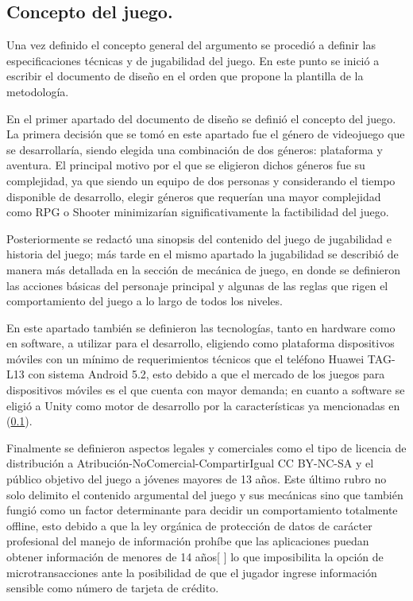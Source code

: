 \subsection{Concepto del juego.}
Una vez definido el concepto general del argumento se procedió a definir las especificaciones técnicas y de jugabilidad del juego. En este punto se inició a escribir el documento de diseño en el orden que propone la plantilla de la metodología. 
\\
\par
En el primer apartado del documento de diseño se definió el concepto del juego. La primera decisión que se tomó en este apartado fue el género de videojuego que se desarrollaría, siendo elegida una combinación de dos géneros: plataforma y aventura. El principal motivo por el que se eligieron dichos géneros fue su complejidad, ya que siendo un equipo de dos personas y considerando el tiempo disponible de desarrollo, elegir géneros que requerían una mayor complejidad como RPG o Shooter minimizarían significativamente la factibilidad del juego.  
\\
\par
Posteriormente se redactó una sinopsis del contenido del juego de jugabilidad e historia del juego; más tarde en el mismo apartado la jugabilidad se describió de manera más detallada en la sección de mecánica de juego, en donde se definieron las acciones básicas del personaje principal y algunas de las reglas que rigen el comportamiento del juego a lo largo de todos los niveles. 
\\
\par
En este apartado también se definieron las tecnologías, tanto en hardware como en software, a utilizar para el desarrollo, eligiendo como plataforma dispositivos móviles con un mínimo de requerimientos técnicos que el teléfono Huawei TAG-L13 con sistema Android 5.2, esto debido a que el mercado de los juegos para dispositivos móviles es el que cuenta con mayor demanda\cite{Ref:EGS}; en cuanto a software se eligió a Unity como motor de desarrollo por la características ya mencionadas en (\ref{}). 
\\
\par
Finalmente se definieron aspectos legales y comerciales como el tipo de licencia de distribución a Atribución-NoComercial-CompartirIgual CC BY-NC-SA y el público objetivo del juego a jóvenes mayores de 13 años. Este último rubro no solo delimito el contenido argumental del juego y sus mecánicas sino que también fungió como un factor determinante para decidir un comportamiento totalmente offline, esto debido a que la ley orgánica de protección de datos de carácter profesional del manejo de información prohíbe que las aplicaciones puedan obtener información de menores de 14 años[ ] lo que imposibilita la opción de microtransacciones ante la posibilidad de que el jugador ingrese información sensible como número de tarjeta de crédito. 
